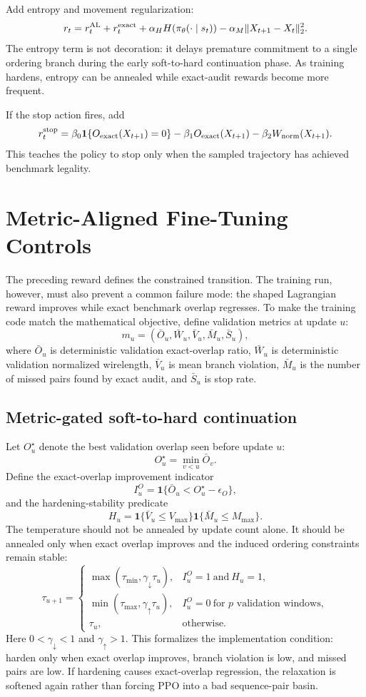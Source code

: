 \documentclass[11pt]{article}
\newcommand{\one}{\mathbf{1}}
\newcommand{\ExactOv}{O_{\rm exact}}
\newcommand{\WireNorm}{W_{\rm norm}}
\begin{document}
Add entropy and movement regularization:
\[
    r_t=r_t^{\rm AL}+r_t^{\rm exact}
    +\alpha_H H(\pi_\theta(\cdot\mid s_t))
    -\alpha_M\|X_{t+1}-X_t\|_2^2.
\]
The entropy term is not decoration: it delays premature commitment to a single ordering branch during the early soft-to-hard continuation phase. As training hardens, entropy can be annealed while exact-audit rewards become more frequent.

If the stop action fires, add
\[
    r_t^{\rm stop}
    =\beta_0\one\{\ExactOv(X_{t+1})=0\}
    -\beta_1\ExactOv(X_{t+1})
    -\beta_2\WireNorm(X_{t+1}).
\]
This teaches the policy to stop only when the sampled trajectory has achieved benchmark legality.

\section{Metric-Aligned Fine-Tuning Controls}

The preceding reward defines the constrained transition. The training run, however, must also prevent a common failure mode: the shaped Lagrangian reward improves while exact benchmark overlap regresses. To make the training code match the mathematical objective, define validation metrics at update $u$:
\[
    m_u=(\bar O_u,\bar W_u,\bar V_u,\bar M_u,\bar S_u),
\]
where $\bar O_u$ is deterministic validation exact-overlap ratio, $\bar W_u$ is deterministic validation normalized wirelength, $\bar V_u$ is mean branch violation, $\bar M_u$ is the number of missed pairs found by exact audit, and $\bar S_u$ is stop rate.

\subsection{Metric-gated soft-to-hard continuation}

Let $O_u^{\star}$ denote the best validation overlap seen before update $u$:
\[
    O_u^{\star}=\min_{v<u}\bar O_v.
\]
Define the exact-overlap improvement indicator
\[
    I_u^{O}=\one\{\bar O_u < O_u^{\star}-\epsilon_O\},
\]
and the hardening-stability predicate
\[
    H_u=\one\{\bar V_u\le V_{\max}\}\one\{\bar M_u\le M_{\max}\}.
\]
The temperature should not be annealed by update count alone. It should be annealed only when exact overlap improves and the induced ordering constraints remain stable:
\[
\tau_{u+1}=\begin{cases}
    \max(\tau_{\min},\gamma_{\downarrow}\tau_u),
        & I_u^{O}=1\ \text{and}\ H_u=1,\\
    \min(\tau_{\max},\gamma_{\uparrow}\tau_u),
        & I_u^{O}=0\ \text{for }p\text{ validation windows},\\
    \tau_u, & \text{otherwise.}
\end{cases}
\]
Here $0<\gamma_{\downarrow}<1$ and $\gamma_{\uparrow}>1$. This formalizes the implementation condition: harden only when exact overlap improves, branch violation is low, and missed pairs are low. If hardening causes exact-overlap regression, the relaxation is softened again rather than forcing PPO into a bad sequence-pair basin.
\end{document}
